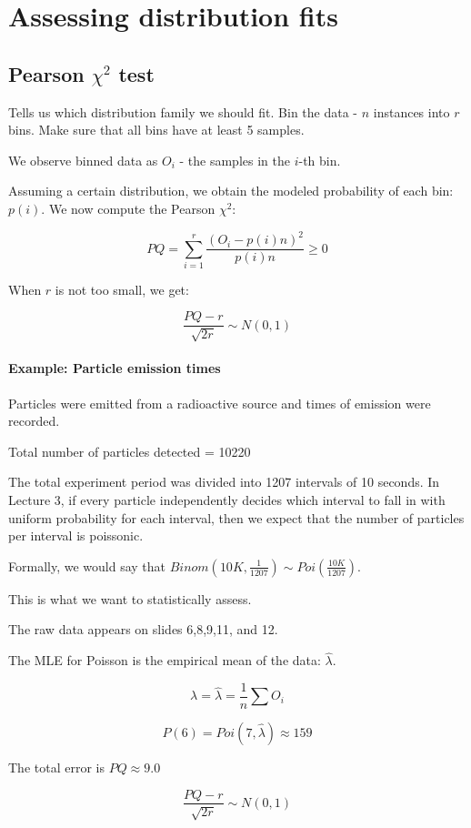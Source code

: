 \documentclass[a4paper]{article}
\begin{document}
\section{Assessing distribution fits}

\subsection{Pearson \texorpdfstring{$\chi^2$}{chi squared} test}
Tells us which distribution family we should fit.
Bin the data - $n$ instances into $r$ bins.
Make sure that all bins have at least 5 samples.

We observe binned data as $O_i$ - the samples in the $i$-th bin.

Assuming a certain distribution, we obtain the modeled probability of each bin: $p(i)$.
We now compute the Pearson $\chi^2$:

\[PQ=\sum_{i=1}^r \frac{(O_i - p(i)n)^2}{p(i)n}\ge 0\]

When $r$ is not too small, we get:

\[\frac{PQ-r}{\sqrt{2r}} \sim N(0,1)\]

\paragraph{Example: Particle emission times}
Particles were emitted from a radioactive source and times of emission were recorded.

Total number of particles detected = 10220

The total experiment period was divided into 1207 intervals of 10 seconds.
In Lecture 3, if every particle independently decides which interval to fall in with uniform probability for each interval, then we expect that the number of particles per interval is poissonic.

Formally, we would say that $Binom\left(10K,\frac{1}{1207}\right) \sim Poi(\frac{10K}{1207})$.

This is what we want to statistically assess.

The raw data appears on slides 6,8,9,11, and 12.

The MLE for Poisson is the empirical mean of the data: $\hat{\lambda}$.

\[\lambda = \hat{\lambda}=\frac{1}{n}\sum O_i\]

\[P(6) = Poi(7,\hat{\lambda}) \approx 159\]

The total error is $PQ \approx 9.0$

\[\frac{PQ-r}{\sqrt{2r}} \sim N(0,1)\]
\end{document}
